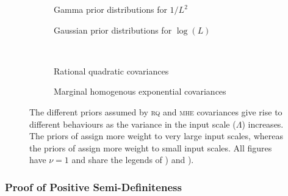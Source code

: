 \documentclass{article}
\begin{document}
\begin{figure}
	\begin{subfigure}[b]{7cm}
		\caption{Gamma prior distributions for $1/L^2$}
		\label{fig:gamma_prior}
	\end{subfigure}
	\begin{subfigure}[b]{7cm}
		\caption{Gaussian prior distributions for $\log(L)$}
		 \label{fig:log_normal_prior}
	\end{subfigure}
 \\[0.2cm]
	\begin{subfigure}[b]{7cm}
		\caption{Rational quadratic covariances}
		\label{fig:RQ_cov}
	\end{subfigure}
	\begin{subfigure}[b]{7cm}
		\caption{Marginal homogenous exponential covariances}
		 \label{fig:our_cov}
	\end{subfigure}
\caption{The different priors assumed by {\scshape rq} and {\scshape mhe} covariances give rise to different behaviours as the variance in the input scale ($\Lambda$) increases. The priors of  assign more weight to very large input scales, whereas the priors of  assign more weight to small input scales. All figures have $\nu = 1$ and share the legends of ) and ).}
\label{fig:rq_vs_our_cov}
\end{figure}


\subsubsection{Proof of Positive Semi-Definiteness}
\end{document}
